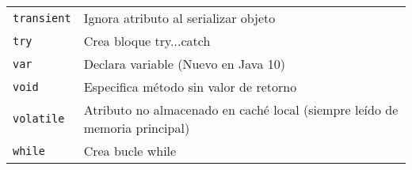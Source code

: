 \documentclass[12pt]{article}
\theoremstyle{largebreak}
\begin{document}
\begin{longtable}{l p{}}
    \lstinline|transient| & Ignora atributo al serializar objeto \\
    \lstinline|try| & Crea bloque try...catch \\
    \lstinline|var| & Declara variable (Nuevo en Java 10) \\
    \lstinline|void| & Especifica método sin valor de retorno \\
    \lstinline|volatile| & Atributo no almacenado en caché local (siempre leído de memoria principal) \\
    \lstinline|while| & Crea bucle while \\
    \bottomrule
    \end{longtable}
\end{document}
